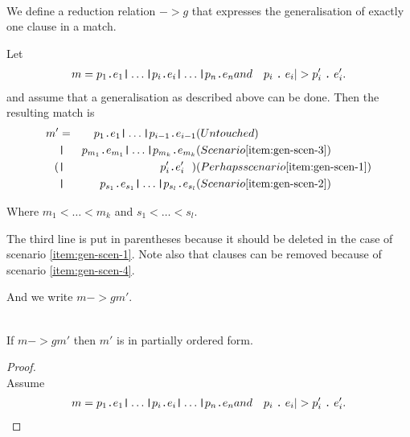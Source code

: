 \begin{definition}[Generalisation, $->g$]\
\label{def:gener-match}\\
  We define a reduction relation $->g$ that expresses the
  generalisation of exactly one clause in a match.

  Let
  \begin{eqnarray*}[rqTcql]
    m = p_1 \texttt{.} e_1 \texttt{|} \ldots \texttt{|} p_i \texttt{.} e_i
    \texttt{|} \ldots \texttt{|} p_n \texttt{.} e_n & and & \clause{p_i}{e_i} |> \clause{p'_i}{e'_i}.
  \end{eqnarray*}
  and assume that a generalisation as described above can be done. Then the
  resulting match is
  \begin{eqnarray*}[rclqqqTl]
    m' &=& p_1 \texttt{.} e_1 \texttt{|} \ldots \texttt{|} p_{i-1} \texttt{.}
    e_{i-1} & (Untouched)\label{eq:gen-1}\\
    &\texttt{|}& p_{m_1} \texttt{.} e_{m_1} \texttt{|} \ldots \texttt{|} p_{m_k}
    \texttt{.} e_{m_k} & (Scenario \ref{item:gen-scen-3})\label{eq:gen-2}\\
    (&\texttt{|}& p'_i \texttt{.} e'_i \ \ ) 
    & (Perhaps scenario \ref{item:gen-scen-1})\label{eq:gen-3}\\
    &\texttt{|}& p_{s_1} \texttt{.} e_{s_1} \texttt{|} \ldots \texttt{|} p_{s_l}
    \texttt{.} e_{s_l} & (Scenario \ref{item:gen-scen-2})\label{eq:gen-4}
  \end{eqnarray*}

  Where $m_1 < \ldots < m_k$ and $s_1 < \ldots < s_l$.

  The third line is put in parentheses because it should be deleted in the case
  of scenario \ref{item:gen-scen-1}. Note also that clauses can be removed
  because of scenario \ref{item:gen-scen-4}.

  And we write $m ->g m'$.

  \begin{lemma}\ \\
    If $m ->g m'$ then $m'$ is in partially ordered form.
  \end{lemma}
  \begin{proof}\ \\
    Assume
    \begin{eqnarray*}[rqTcql]
      m = p_1 \texttt{.} e_1 \texttt{|} \ldots \texttt{|} p_i \texttt{.} e_i
      \texttt{|} \ldots \texttt{|} p_n \texttt{.} e_n & and & \clause{p_i}{e_i} |> \clause{p'_i}{e'_i}.
    \end{eqnarray*}


\end{proof}
\end{definition}
